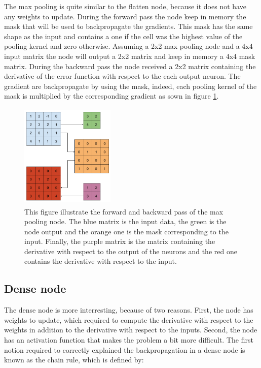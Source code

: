 \documentclass[11pt]{report}
\begin{document}
The max pooling is quite similar to the flatten node, because it does not have any weights to update. During the forward pass the node keep in memory the mask that will be used to backpropagate the gradients. This mask has the same shape as the input and contains a one if the cell was the highest value of the pooling kernel and zero otherwise. Assuming a 2x2 max pooling node and a 4x4 input matrix the node will output a 2x2 matrix and keep in memory a 4x4 mask matrix. During the backward pass the node received a 2x2 matrix containing the derivative of the error function with respect to the each output neuron. The gradient are backpropagate by using the mask, indeed, each pooling kernel of the mask is multiplied by the corresponding gradient as sown in figure \ref{fig:max_pooling_bp}.

\begin{figure}[h]
\centering
\includegraphics[width=4.5cm, height=5cm]{max_pooling_bp}
\caption{This figure illustrate the forward and backward pass of the max pooling node. The blue matrix is the input data, the green is the node output and the orange one is the mask corresponding to the input. Finally, the purple matrix is the matrix containing the derivative with respect to the output of the neurons and the red one contains the derivative with respect to the input.}
\label{fig:max_pooling_bp}
\end{figure}

\subsection{Dense node}

The dense node is more interresting, because of two reasons. First, the node has weights to update, which required to compute the derivative with respect to the weights in addition to the derivative with respect to the inputs. Second, the node has an activation function that makes the problem a bit more difficult. The first notion required to correctly explained the backpropagation in a dense node is known as the chain rule, which is defined by:
\end{document}
